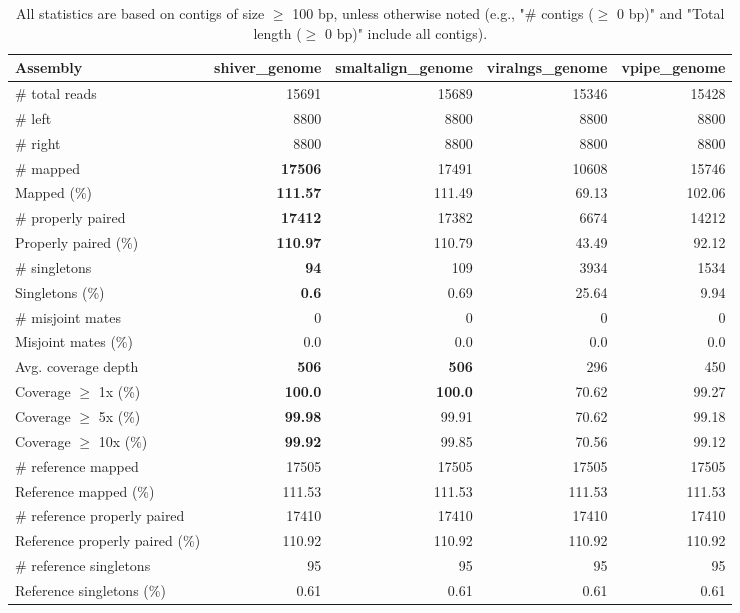 \documentclass[12pt,a4paper]{article}
\begin{document}
\begin{table}[ht]
\begin{center}
\caption{All statistics are based on contigs of size $\geq$ 100 bp, unless otherwise noted (e.g., "\# contigs ($\geq$ 0 bp)" and "Total length ($\geq$ 0 bp)" include all contigs).}
\begin{tabular}{|l*{4}{|r}|}
\hline
Assembly & shiver\_genome & smaltalign\_genome & viralngs\_genome & vpipe\_genome \\ \hline
\# total reads & 15691 & 15689 & 15346 & 15428 \\ \hline
\# left & 8800 & 8800 & 8800 & 8800 \\ \hline
\# right & 8800 & 8800 & 8800 & 8800 \\ \hline
\# mapped & {\bf 17506} & 17491 & 10608 & 15746 \\ \hline
Mapped (\%) & {\bf 111.57} & 111.49 & 69.13 & 102.06 \\ \hline
\# properly paired & {\bf 17412} & 17382 & 6674 & 14212 \\ \hline
Properly paired (\%) & {\bf 110.97} & 110.79 & 43.49 & 92.12 \\ \hline
\# singletons & {\bf 94} & 109 & 3934 & 1534 \\ \hline
Singletons (\%) & {\bf 0.6} & 0.69 & 25.64 & 9.94 \\ \hline
\# misjoint mates & 0 & 0 & 0 & 0 \\ \hline
Misjoint mates (\%) & 0.0 & 0.0 & 0.0 & 0.0 \\ \hline
Avg. coverage depth & {\bf 506} & {\bf 506} & 296 & 450 \\ \hline
Coverage $\geq$ 1x (\%) & {\bf 100.0} & {\bf 100.0} & 70.62 & 99.27 \\ \hline
Coverage $\geq$ 5x (\%) & {\bf 99.98} & 99.91 & 70.62 & 99.18 \\ \hline
Coverage $\geq$ 10x (\%) & {\bf 99.92} & 99.85 & 70.56 & 99.12 \\ \hline
\# reference mapped & 17505 & 17505 & 17505 & 17505 \\ \hline
Reference mapped (\%) & 111.53 & 111.53 & 111.53 & 111.53 \\ \hline
\# reference properly paired & 17410 & 17410 & 17410 & 17410 \\ \hline
Reference properly paired (\%) & 110.92 & 110.92 & 110.92 & 110.92 \\ \hline
\# reference singletons & 95 & 95 & 95 & 95 \\ \hline
Reference singletons (\%) & 0.61 & 0.61 & 0.61 & 0.61 \\ \hline

\end{tabular}
\end{center}
\end{table}
\end{document}
